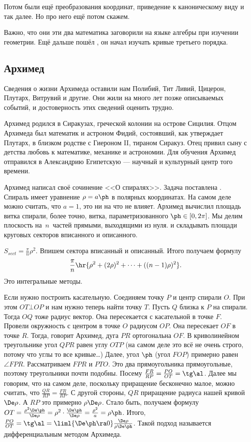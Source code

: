 \documentclass[a4paper,oneside,fleqn,10pt]{article}
\begin{document}
Потом были ещё преобразования координат, приведение к каноническому
виду и так далее.  Но про него ещё потом скажем.

Важно, что они эти два математика заговорили на языке алгебры при
изучении геометрии.  Ещё дальше пошёл , он начал изучать
кривые третьего порядка.


\subsection{Архимед}
Сведения о жизни Архимеда оставили нам Полибий, Тит Ливий, Цицерон,
Плутарх, Витрувий и другие. Они жили на много лет позже описываемых
событий, и достоверность этих сведений оценить трудно.

Архимед родился в Сиракузах, греческой колонии на острове
Сицилия. Отцом Архимеда был математик и астроном Фидий, состоявший,
как утверждает Плутарх, в близком родстве с Гиероном II, тираном
Сиракуз. Отец привил сыну с детства любовь к математике, механике и
астрономии. Для обучения Архимед отправился в Александрию Египетскую —
научный и культурный центр того времени.

Архимед написал своё сочинение <<О спиралях>>. Задача поставлена
 .  Спираль имеет
уравнение $\rho = a\ph$ в полярных координатах. На самом деле можно
считать, что $a = 1$, это ни на что не влияет. Архимед вычислил
площадь витка спирали, более точно, витка, параметризованного $\ph \in
[0,2\pi]$.  Мы делим плоскость на~$n$~частей прямыми, выходящими из
нуля. и складывать площади круговых секторов вписанного и описанного.

$S_{sect} = \frac{\pi}{n}\rho^2$. Впишем сектора вписанный и
описанный.  Итого получаем формулу
$$\frac\pi n \hr{\rho^2 + (2\rho)^2 + \dots + ((n-1)\rho)^2}.$$ Это
интегральные методы.

Если нужно построить касательную. Соединяем точку $P$ и центр спирали
$O$.  При этом $OT \bot OP$ и нам нужно теперь найти точку $T$.  Пусть
$Q$ близка к $P$ на спирали. Тогда $OQ$ тоже радиус вектор. Она
пересекается с касательной в точке $F$. Провели окружность с центром в
точке $O$ радиусом $OP$.  Она пересекает $OF$ в точке $R$. Тогда,
говорит Архимед, дуга $PR$ ортогональна $OF$.  В криволинейном
треугольнике угол $QPR$ равен углу $OTP$ (на самом деле это всё не
очень строго, потому что углы то все кривые\ldots) Далее, угол $\ph$
(угол $FOP$) примерно равен $\angle FPR$. Рассматриваем $FPR$ и $PTO$.
Это два прямоугольника прямоугольные, поэтому треугольники почти
подобны.  Посему $\frac{FR}{RP} = \frac{PO}{OT} = \tg \al$.  Далее мы
говорим, что на самом деле, поскольку приращение бесконечно малое,
можно считать, что $\frac{QR}{RP} = \frac{FR}{RP}$. С другой стороны,
$QR$ приращение радиуса нашей кривой $\De\rho$. А $RP$ это примерно
$\rho \De\rho$.  Стало быть, получаем формулу $OT =
\frac{\rho^2\De\ph}{\De\rho} = \rho^2\cdot \frac{\De\ph}{\De\rho} =
\frac{\rho^2}{a} = \rho\ph$. Итого, $\frac{PO}{OT} = \tg \al =
\liml{\De\ph \ra 0} \frac{\De\rho}{\rho \De\ph}$.  Такой подход
называется дифференциальным методом Архимеда.
\end{document}
